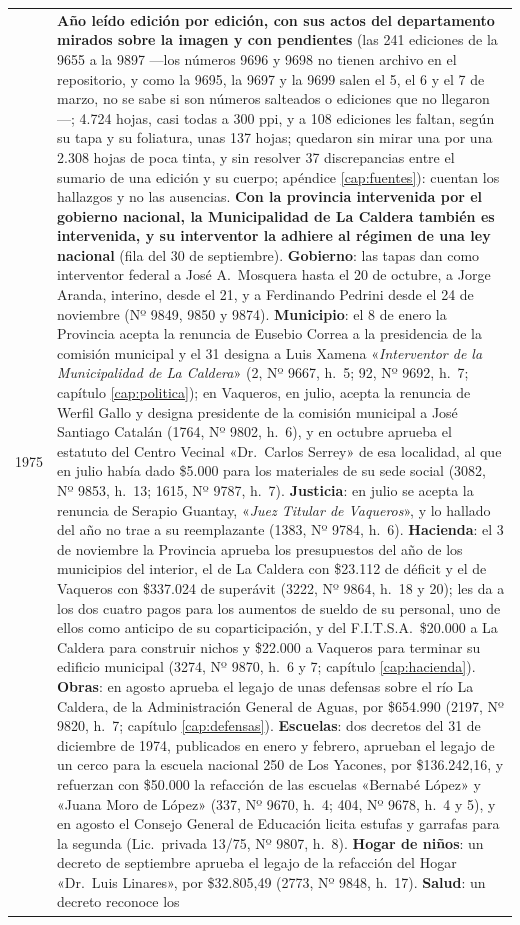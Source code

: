 \begin{longtable}{@{}p{2.7cm}p{10.3cm}@{}}
1975 & \textbf{Año leído edición por edición, con sus actos del departamento mirados sobre la imagen y con pendientes} (las 241 ediciones de la 9655 a la 9897 ---los números 9696 y 9698 no tienen archivo en el repositorio, y como la 9695, la 9697 y la 9699 salen el 5, el 6 y el 7 de marzo, no se sabe si son números salteados o ediciones que no llegaron---; 4.724 hojas, casi todas a 300 ppi, y a 108 ediciones les faltan, según su tapa y su foliatura, unas 137 hojas; quedaron sin mirar una por una 2.308 hojas de poca tinta, y sin resolver 37 discrepancias entre el sumario de una edición y su cuerpo; apéndice \ref{cap:fuentes}): cuentan los hallazgos y no las ausencias. \textbf{Con la provincia intervenida por el gobierno nacional, la Municipalidad de La Caldera también es intervenida, y su interventor la adhiere al régimen de una ley nacional} (fila del 30 de septiembre). \textbf{Gobierno}: las tapas dan como interventor federal a José A.\ Mosquera hasta el 20 de octubre, a Jorge Aranda, interino, desde el 21, y a Ferdinando Pedrini desde el 24 de noviembre (Nº 9849, 9850 y 9874). \textbf{Municipio}: el 8 de enero la Provincia acepta la renuncia de Eusebio Correa a la presidencia de la comisión municipal y el 31 designa a Luis Xamena «\textit{Interventor de la Municipalidad de La Caldera}» (2, Nº 9667, h.\ 5; 92, Nº 9692, h.\ 7; capítulo \ref{cap:politica}); en Vaqueros, en julio, acepta la renuncia de Werfil Gallo y designa presidente de la comisión municipal a José Santiago Catalán (1764, Nº 9802, h.\ 6), y en octubre aprueba el estatuto del Centro Vecinal «Dr.\ Carlos Serrey» de esa localidad, al que en julio había dado \$5.000 para los materiales de su sede social (3082, Nº 9853, h.\ 13; 1615, Nº 9787, h.\ 7). \textbf{Justicia}: en julio se acepta la renuncia de Serapio Guantay, «\textit{Juez Titular de Vaqueros}», y lo hallado del año no trae a su reemplazante (1383, Nº 9784, h.\ 6). \textbf{Hacienda}: el 3 de noviembre la Provincia aprueba los presupuestos del año de los municipios del interior, el de La Caldera con \$23.112 de déficit y el de Vaqueros con \$337.024 de superávit (3222, Nº 9864, h.\ 18 y 20); les da a los dos cuatro pagos para los aumentos de sueldo de su personal, uno de ellos como anticipo de su coparticipación, y del F.I.T.S.A.\ \$20.000 a La Caldera para construir nichos y \$22.000 a Vaqueros para terminar su edificio municipal (3274, Nº 9870, h.\ 6 y 7; capítulo \ref{cap:hacienda}). \textbf{Obras}: en agosto aprueba el legajo de unas defensas sobre el río La Caldera, de la Administración General de Aguas, por \$654.990 (2197, Nº 9820, h.\ 7; capítulo \ref{cap:defensas}). \textbf{Escuelas}: dos decretos del 31 de diciembre de 1974, publicados en enero y febrero, aprueban el legajo de un cerco para la escuela nacional 250 de Los Yacones, por \$136.242,16, y refuerzan con \$50.000 la refacción de las escuelas «Bernabé López» y «Juana Moro de López» (337, Nº 9670, h.\ 4; 404, Nº 9678, h.\ 4 y 5), y en agosto el Consejo General de Educación licita estufas y garrafas para la segunda (Lic.\ privada 13/75, Nº 9807, h.\ 8). \textbf{Hogar de niños}: un decreto de septiembre aprueba el legajo de la refacción del Hogar «Dr.\ Luis Linares», por \$32.805,49 (2773, Nº 9848, h.\ 17). \textbf{Salud}: un decreto reconoce los 
\end{longtable}
